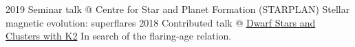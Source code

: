\documentclass[11pt]{k-cv} %
\begin{document}
\begin{entrylist}
\entry
{2019}
{Seminar talk @ Centre for Star and Planet Formation (STARPLAN)}
{}%
{Stellar magnetic evolution: superflares}
\entry
{2018}
{Contributed talk @ \href{https://keplergo.github.io/KeplerScienceWebsite/workshop-on-dwarf-stars-and-clusters-with-k2-registration-now-open-space-is-limited.html}{Dwarf Stars and Clusters with K2}}
{}%
{In search of the flaring-age relation.}
\end{entrylist}


%




\end{document}
